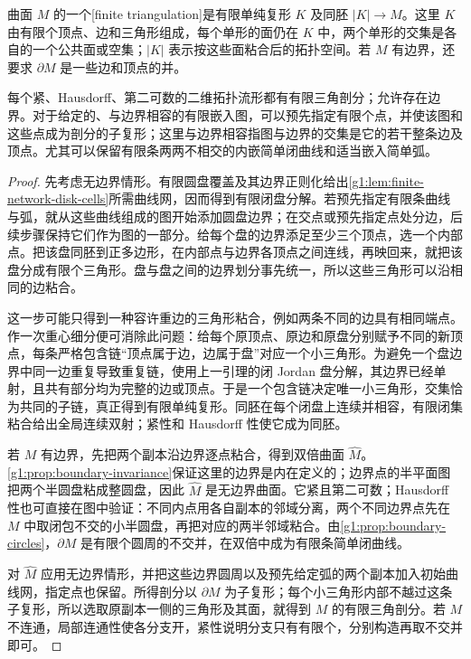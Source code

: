 \begin{definition}\label{g1:def:surface-triangulation}
	曲面 \(M\) 的一个[finite triangulation]是有限单纯复形 \(K\) 及同胚 \(|K|\to M\)。这里 \(K\) 由有限个顶点、边和三角形组成，每个单形的面仍在 \(K\) 中，两个单形的交集是各自的一个公共面或空集；\(|K|\) 表示按这些面粘合后的拓扑空间。若 \(M\) 有边界，还要求 \(\partial M\) 是一些边和顶点的并。
\end{definition}

\begin{theorem}\label{g1:thm:surface-triangulation}
	每个紧、Hausdorff、第二可数的二维拓扑流形都有有限三角剖分；允许存在边界。对于给定的、与边界相容的有限嵌入图，可以预先指定有限个点，并使该图和这些点成为剖分的子复形；这里与边界相容指图与边界的交集是它的若干整条边及顶点。尤其可以保留有限条两两不相交的内嵌简单闭曲线和适当嵌入简单弧。
\end{theorem}

\begin{proof}
	先考虑无边界情形。有限圆盘覆盖及其边界正则化给出\cref{g1:lem:finite-network-disk-cells}所需曲线网，因而得到有限闭盘分解。若预先指定有限条曲线与弧，就从这些曲线组成的图开始添加圆盘边界；在交点或预先指定点处分边，后续步骤保持它们作为图的一部分。给每个盘的边界添足至少三个顶点，选一个内部点。把该盘同胚到正多边形，在内部点与边界各顶点之间连线，再映回来，就把该盘分成有限个三角形。盘与盘之间的边界划分事先统一，所以这些三角形可以沿相同的边粘合。

	这一步可能只得到一种容许重边的三角形粘合，例如两条不同的边具有相同端点。作一次重心细分便可消除此问题：给每个原顶点、原边和原盘分别赋予不同的新顶点，每条严格包含链“顶点属于边，边属于盘”对应一个小三角形。为避免一个盘边界中同一边重复导致重复链，使用上一引理的闭 Jordan 盘分解，其边界已经单射，且共有部分均为完整的边或顶点。于是一个包含链决定唯一小三角形，交集恰为共同的子链，真正得到有限单纯复形。同胚在每个闭盘上连续并相容，有限闭集粘合给出全局连续双射；紧性和 Hausdorff 性使它成为同胚。

	若 \(M\) 有边界，先把两个副本沿边界逐点粘合，得到双倍曲面 \(\widehat M\)。\cref{g1:prop:boundary-invariance}保证这里的边界是内在定义的；边界点的半平面图把两个半圆盘粘成整圆盘，因此 \(\widehat M\) 是无边界曲面。它紧且第二可数；Hausdorff 性也可直接在图中验证：不同内点用各自副本的邻域分离，两个不同边界点先在 \(M\) 中取闭包不交的小半圆盘，再把对应的两半邻域粘合。由\cref{g1:prop:boundary-circles}，\(\partial M\) 是有限个圆周的不交并，在双倍中成为有限条简单闭曲线。

	对 \(\widehat M\) 应用无边界情形，并把这些边界圆周以及预先给定弧的两个副本加入初始曲线网，指定点也保留。所得剖分以 \(\partial M\) 为子复形；每个小三角形内部不越过这条子复形，所以选取原副本一侧的三角形及其面，就得到 \(M\) 的有限三角剖分。若 \(M\) 不连通，局部连通性使各分支开，紧性说明分支只有有限个，分别构造再取不交并即可。
\end{proof}

